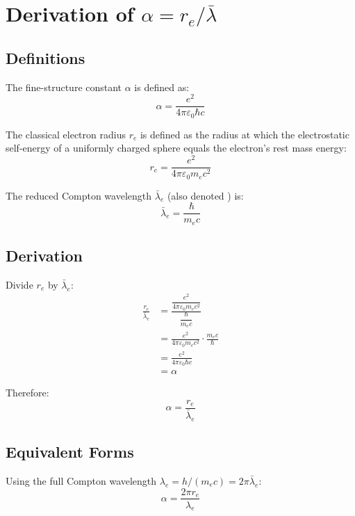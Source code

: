 \documentclass{article}
\begin{document}
\section{Derivation of $\alpha = r_e / \bar{\lambda}$}

\subsection{Definitions}

The fine-structure constant $\alpha$ is defined as:
\begin{equation}
\alpha = \frac{e^2}{4\pi\varepsilon_0 \hbar c}
\end{equation}

The classical electron radius $r_e$ is defined as the radius at which
the electrostatic self-energy of a uniformly charged sphere equals
the electron's rest mass energy:
\begin{equation}
r_e = \frac{e^2}{4\pi\varepsilon_0 m_e c^2}
\end{equation}

The reduced Compton wavelength $\bar{\lambda}_e$ (also denoted \lambdabar) is:
\begin{equation}
\bar{\lambda}_e = \frac{\hbar}{m_e c}
\end{equation}

\subsection{Derivation}

Divide $r_e$ by $\bar{\lambda}_e$:
\begin{align}
\frac{r_e}{\bar{\lambda}_e}
&= \frac{ \dfrac{e^2}{4\pi\varepsilon_0 m_e c^2} }
        { \dfrac{\hbar}{m_e c} } \\[12pt]
&= \frac{e^2}{4\pi\varepsilon_0 m_e c^2} \cdot \frac{m_e c}{\hbar} \\[12pt]
&= \frac{e^2}{4\pi\varepsilon_0 \hbar c} \\[6pt]
&= \alpha
\end{align}

Therefore:
\begin{equation}
\boxed{\alpha = \frac{r_e}{\bar{\lambda}_e}}
\end{equation}

\subsection{Equivalent Forms}

Using the full Compton wavelength $\lambda_e = h/(m_e c) = 2\pi\bar{\lambda}_e$:
\begin{equation}
\alpha = \frac{2\pi r_e}{\lambda_e}
\end{equation}
\end{document}
